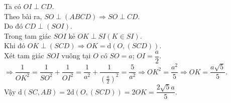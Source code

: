 \begin{ex}
{		Ta có $O I \perp  C D$.\\
		 Theo bài ra, $S O \perp(A B C D) \Rightarrow S O \perp C D$.\\
		Do đó $C D  \perp(S O I)$.\\
		Trong tam giác $S O I$ kẻ $O K \perp S I(K \in  S I)$.\\ Khi đó $O K \perp(S C D) \Rightarrow O K=\mathrm{d}(O,(S C D))$.\\
		Xét tam giác $S O I$  vuông tại $O$ có $S O=a$; $OI=\dfrac{a}{2}$.
		$\Rightarrow\dfrac{1}{O K^{2}}=\dfrac{1}{S O^{2}}+\dfrac{1}{O I^{2}}=\dfrac{1}{a^{2}}+\dfrac{1}{\left(\frac{a}{2}\right)^{2}}=\dfrac{5}{a^{2}} \Rightarrow O K^{2}=\dfrac{a^{2}}{5}  \Rightarrow O K=\dfrac{a \sqrt{5}}{5}$.\\
		Vậy $\mathrm{d}(S C, A  B)=2 \mathrm{d}(O,(S C D))=2 O K=\dfrac{2 \sqrt{5} a}{5}$.
	} 
\end{ex}

